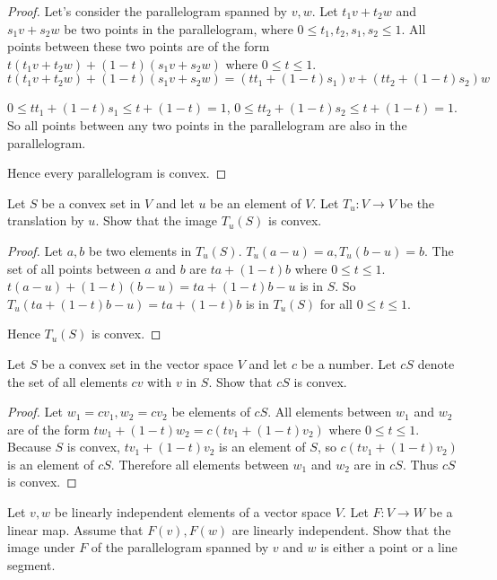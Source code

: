 \begin{proof}
    Let's consider the parallelogram spanned by $v, w$. Let $t_{1}v + t_{2}w$ and $s_{1}v + s_{2}w$ be two points in the parallelogram, where $0\leq t_{1}, t_{2}, s_{1}, s_{2} \leq 1$. All points between these two points are of the form $t(t_{1}v + t_{2}w) + (1 - t)(s_{1}v + s_{2}w)$ where $0\leq t \leq 1$.
    \[
        t(t_{1}v + t_{2}w) + (1 - t)(s_{1}v + s_{2}w) = (tt_{1} + (1-t)s_{1})v + (tt_{2} + (1-t)s_{2})w
    \]

    $0\leq tt_{1} + (1 - t)s_{1} \leq t + (1-t) = 1$, $0\leq tt_{2} + (1-t)s_{2}\leq t + (1-t) = 1$. So all points between any two points in the parallelogram are also in the parallelogram.

    Hence every parallelogram is convex.
\end{proof}

\begin{exercise}
    Let $S$ be a convex set in $V$ and let $u$ be an element of $V$. Let $T_{u}: V\to V$ be the translation by $u$. Show that the image $T_{u}(S)$ is convex.
\end{exercise}

\begin{proof}
    Let $a, b$ be two elements in $T_{u}(S)$. $T_{u}(a - u) = a, T_{u}(b - u) = b$. The set of all points between $a$ and $b$ are $ta + (1-t)b$ where $0\leq t\leq 1$. $t(a-u) + (1-t)(b-u) = ta + (1-t)b - u$ is in $S$. So $T_{u}(ta + (1-t)b - u) = ta + (1-t)b$ is in $T_{u}(S)$ for all $0\leq t\leq 1$.

    Hence $T_{u}(S)$ is convex.
\end{proof}

\begin{exercise}
    Let $S$ be a convex set in the vector space $V$ and let $c$ be a number. Let $cS$ denote the set of all elements $cv$ with $v$ in $S$. Show that $cS$ is convex.
\end{exercise}

\begin{proof}
    Let $w_{1} = cv_{1}, w_{2} = cv_{2}$ be elements of $cS$. All elements between $w_{1}$ and $w_{2}$ are of the form $tw_{1} + (1-t)w_{2} = c(tv_{1} + (1-t)v_{2})$ where $0\leq t\leq 1$. Because $S$ is convex, $tv_{1} + (1-t)v_{2}$ is an element of $S$, so $c(tv_{1} + (1-t)v_{2})$ is an element of $cS$. Therefore all elements between $w_{1}$ and $w_{2}$ are in $cS$. Thus $cS$ is convex.
\end{proof}

\begin{exercise}
    Let $v, w$ be linearly independent elements of a vector space $V$. Let $F: V\to W$ be a linear map. Assume that $F(v), F(w)$ are linearly independent. Show that the image under $F$ of the parallelogram spanned by $v$ and $w$ is either a point or a line segment.
\end{exercise}

